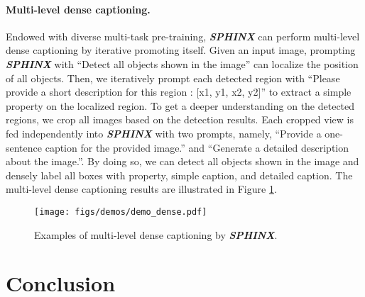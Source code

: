 \documentclass{article} \usepackage{iclr2024_conference,times}
\begin{document}
\paragraph{Multi-level dense captioning.}
Endowed with diverse multi-task pre-training, \textcolor{Goldenrod3}{\textbf{\textit{SPHINX}}} can perform multi-level dense captioning by iterative promoting itself. Given an input image, prompting \textcolor{Goldenrod3}{\textbf{\textit{SPHINX}}} with ``Detect all objects shown in the image'' can localize the position of all objects. Then, we iteratively prompt each detected region with ``Please provide a short description for this region : [x1, y1, x2, y2]'' to extract a simple property on the localized region. To get a deeper understanding on the detected regions, we crop all images based on the detection results. Each cropped view is fed independently into \textcolor{Goldenrod3}{\textbf{\textit{SPHINX}}} with two prompts, namely, ``Provide a one-sentence caption for the provided image.'' and ``Generate a detailed description about the image.''. By doing so, we can detect all objects shown in the image and densely label all boxes with property, simple caption, and detailed caption. The multi-level dense captioning results are illustrated in Figure \ref{fig:demo_dense}.

\begin{figure}[t]
    \centering
\texttt{[image: figs/demos/demo\_dense.pdf]}
    \caption{Examples of multi-level dense captioning by \textcolor{Goldenrod3}{\textbf{\textit{SPHINX}}.
    }}
    \label{fig:demo_dense}
\end{figure}


\section{Conclusion}
\end{document}
